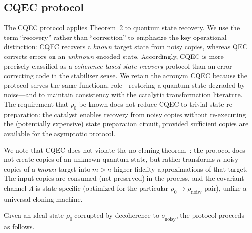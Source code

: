 \documentclass[prx,twocolumn,superscriptaddress,longbibliography,floatfix]{revtex4-2}
\begin{document}
\subsection{CQEC protocol}
\label{sec:icec_protocol}

The CQEC protocol applies Theorem~2 to quantum state recovery.
We use the term ``recovery'' rather than ``correction'' to emphasize the key operational distinction: CQEC recovers a \emph{known} target state from noisy copies, whereas QEC corrects errors on an \emph{unknown} encoded state.
Accordingly, CQEC is more precisely classified as a \emph{coherence-based state recovery} protocol than an error-correcting code in the stabilizer sense.
We retain the acronym CQEC because the protocol serves the same functional role---restoring a quantum state degraded by noise---and to maintain consistency with the catalytic transformation literature.
The requirement that $\rho_0$ be known does not reduce CQEC to trivial state re-preparation: the catalyst enables recovery from noisy copies without re-executing the (potentially expensive) state preparation circuit, provided sufficient copies are available for the asymptotic protocol.

We note that CQEC does not violate the no-cloning theorem~\cite{Wootters1982}: the protocol does not create copies of an unknown quantum state, but rather transforms $n$ noisy copies of a \emph{known} target into $m > n$ higher-fidelity approximations of that target.
The input copies are consumed (not preserved) in the process, and the covariant channel $\Lambda$ is state-specific (optimized for the particular $\rho_0 \to \rho_\mathrm{noisy}$ pair), unlike a universal cloning machine.

Given an ideal state $\rho_0$ corrupted by decoherence to $\rho_\mathrm{noisy}$, the protocol proceeds as follows.
\end{document}
